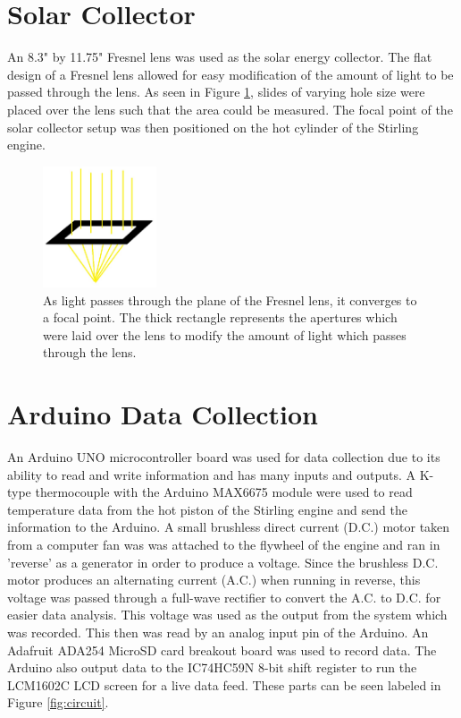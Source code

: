 \section{Solar Collector}

    An 8.3" by 11.75" Fresnel lens was used as the solar energy collector. The flat design of a Fresnel lens allowed for easy modification of the amount of light to be passed through the lens.  As seen in Figure \ref{fig:fresnel}, slides of varying hole size were placed over the lens such that the area could be measured. The focal point of the solar collector setup was then positioned on the hot cylinder of the Stirling engine.
    
    \begin{figure}[H]
        \centering
        \includegraphics[width=0.3\textwidth]{diagrams/fresnel}
        \caption[Fresnel lens]{As light passes through the plane of the Fresnel lens, it converges to a focal point. The thick rectangle represents the apertures which were laid over the lens to modify the amount of light which passes through the lens.}
        \label{fig:fresnel}
    \end{figure}

\section{Arduino Data Collection}

    An Arduino UNO microcontroller board was used for data collection due to its ability to read and write information and has many inputs and outputs. A K-type thermocouple with the Arduino MAX6675 module were used to read temperature data from the hot piston of the Stirling engine and send the information to the Arduino. A small brushless direct current (D.C.) motor taken from a computer fan was was attached to the flywheel of the engine and ran in 'reverse' as a generator in order to produce a voltage. Since the brushless D.C. motor produces an alternating current (A.C.) when running in reverse, this voltage was passed through a full-wave rectifier to convert the A.C. to D.C. for easier data analysis. This voltage was used as the output from the system which was recorded. This then was read by an analog input pin of the Arduino. An Adafruit ADA254 MicroSD card breakout board was used to record data. The Arduino also output data to the IC74HC59N 8-bit shift register to run the LCM1602C LCD screen for a live data feed. These parts can be seen labeled in Figure \ref{fig:circuit}.
    
